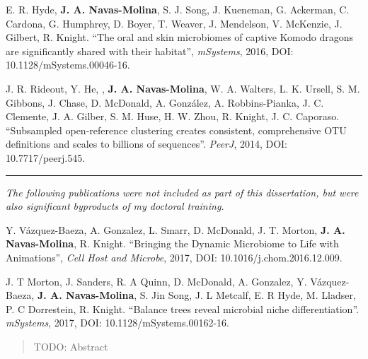 \begin{frontmatter}
\begin{vitapage}
\begin{publications}
	\item E. R. Hyde, \textbf{J. A. Navas-Molina}, S. J. Song, J. Kueneman, G. Ackerman, C. Cardona, G. Humphrey, D. Boyer, T. Weaver, J. Mendelson, V. McKenzie, J. Gilbert, R. Knight. ``The oral and skin microbiomes of captive Komodo dragons are significantly shared with their habitat'', \emph{mSystems}, 2016, DOI: 10.1128/mSystems.00046-16.

	\item J. R. Rideout, Y. He, , \textbf{J. A. Navas-Molina}, W. A. Walters, L. K. Ursell, S. M. Gibbons, J. Chase, D. McDonald, A. Gonz\'alez, A. Robbins-Pianka, J. C. Clemente, J. A. Gilber, S. M. Huse, H. W. Zhou, R. Knight, J. C. Caporaso. ``Subsampled open-reference clustering creates consistent, comprehensive OTU definitions and scales to billions of sequences''. \emph{PeerJ}, 2014, DOI: 10.7717/peerj.545.

	\item \noindent\rule[0.5ex]{\linewidth}{0.5pt}

    \textsl{The following publications were not included as part of this dissertation, but were also significant byproducts of my doctoral training.}

	\item Y. V\'azquez-Baeza, A. Gonzalez, L. Smarr, D. McDonald, J. T. Morton, \textbf{J. A. Navas-Molina}, R. Knight. ``Bringing the Dynamic Microbiome to Life with Animations'', \emph{Cell Host and Microbe}, 2017, DOI: 10.1016/j.chom.2016.12.009.

	\item J. T Morton, J. Sanders, R. A Quinn, D. McDonald, A. Gonzalez, Y. V\'azquez-Baeza, \textbf{J. A. Navas-Molina}, S. Jin Song, J. L Metcalf, E. R Hyde, M. Lladser, P. C Dorrestein, R. Knight. ``Balance trees reveal microbial niche differentiation''. \emph{mSystems}, 2017, DOI: 10.1128/mSystems.00162-16.

\end{publications}


\end{vitapage}


%
%
\begin{abstract}

	TODO: Abstract

\end{abstract}


\end{frontmatter}
